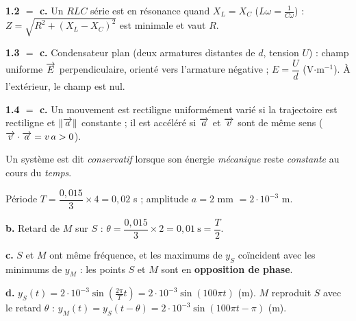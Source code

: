 \documentclass[11pt]{article}
\begin{document}
\textbf{1.2 $= $ c.} Un $RLC$ série est en résonance quand $X_L = X_C$ ($L\omega = \frac{1}{C\omega}$) : $Z = \sqrt{R^2 + (X_L - X_C)^2}$ est minimale et vaut $R$.

\textbf{1.3 $= $ c.} Condensateur plan (deux armatures distantes de $d$, tension $U$) : champ uniforme $\overrightarrow{E}$ perpendiculaire, orienté vers l'armature négative ; $E = \dfrac{U}{d}$ (V$\cdot$m$^{-1}$). À l'extérieur, le champ est nul.
\begin{center}
\end{center}

\textbf{1.4 $= $ c.} Un mouvement est rectiligne uniformément varié si la trajectoire est rectiligne et $\|\overrightarrow{a}\|$ constante ; il est accéléré si $\overrightarrow{a}$ et $\overrightarrow{v}$ sont de même sens ($\overrightarrow{v}\cdot\overrightarrow{a} = v\,a > 0$).

Un système est dit \emph{conservatif} lorsque son énergie \emph{mécanique} reste \emph{constante} au cours du \emph{temps}.


 Période $T = \dfrac{0{,}015}{3}\times 4 = 0{,}02$ s ; amplitude $a = 2$ mm $= 2\cdot10^{-3}$ m.

\textbf{b.} Retard de $M$ sur $S$ : $\theta = \dfrac{0{,}015}{3}\times 2 = 0{,}01\ \text{s} = \dfrac{T}{2}$.

\textbf{c.} $S$ et $M$ ont même fréquence, et les maximums de $y_S$ coïncident avec les minimums de $y_M$ : les points $S$ et $M$ sont en \textbf{opposition de phase}.

\textbf{d.} $y_S(t) = 2\cdot10^{-3}\sin\left(\frac{2\pi}{T}t\right) = 2\cdot10^{-3}\sin(100\pi t)$ (m). $M$ reproduit $S$ avec le retard $\theta$ : $y_M(t) = y_S(t - \theta) = 2\cdot10^{-3}\sin(100\pi t - \pi)$ (m).
\end{document}
